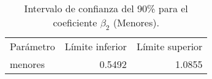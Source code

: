 \begin{table}[H]
    \centering
    \color{blue}
    \caption{Intervalo de confianza del 90\% para el coeficiente $\beta_2$ (Menores).}
    \label{tab:ci_beta2}
    \begin{tabular}{lrr}
        
        Parámetro & Límite inferior & Límite superior \\
        
        menores & 0.5492 & 1.0855 \\
        
    \end{tabular}
\end{table}
